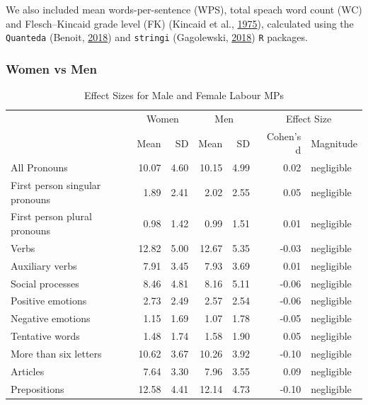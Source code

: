 \documentclass[]{article}
\theoremstyle{definition}
\theoremstyle{definition}
\theoremstyle{definition}
\theoremstyle{remark}
\begin{document}
We also included mean words-per-sentence (WPS), total speach word count
(WC) and Flesch--Kincaid grade level (FK) (Kincaid et al.,
\protect\hyperlink{ref-kincaid1975}{1975}), calculated using the
\texttt{Quanteda} (Benoit, \protect\hyperlink{ref-benoit2018}{2018}) and
\texttt{stringi} (Gagolewski,
\protect\hyperlink{ref-gagolewski2018}{2018}) \texttt{R} packages.

\hypertarget{women-vs-men}{%
\subsubsection{Women vs Men}\label{women-vs-men}}

\begin{table}[H]

\caption{\label{tab:gender-effect-sizes-table}Effect Sizes for Male and Female Labour MPs}
\centering
\begin{tabular}[t]{lrrrrrl}
\toprule
\multicolumn{1}{c}{ } & \multicolumn{2}{c}{Women} & \multicolumn{2}{c}{Men} & \multicolumn{2}{c}{Effect Size} \\
\cmidrule(l{2pt}r{2pt}){2-3} \cmidrule(l{2pt}r{2pt}){4-5} \cmidrule(l{2pt}r{2pt}){6-7}
 & Mean & SD & Mean & SD & Cohen's d & Magnitude\\
\midrule
All Pronouns & 10.07 & 4.60 & 10.15 & 4.99 & 0.02 & negligible\\
First person singular pronouns & 1.89 & 2.41 & 2.02 & 2.55 & 0.05 & negligible\\
First person plural pronouns & 0.98 & 1.42 & 0.99 & 1.51 & 0.01 & negligible\\
Verbs & 12.82 & 5.00 & 12.67 & 5.35 & -0.03 & negligible\\
Auxiliary verbs & 7.91 & 3.45 & 7.93 & 3.69 & 0.01 & negligible\\
\addlinespace
Social processes & 8.46 & 4.81 & 8.16 & 5.11 & -0.06 & negligible\\
Positive emotions & 2.73 & 2.49 & 2.57 & 2.54 & -0.06 & negligible\\
Negative emotions & 1.15 & 1.69 & 1.07 & 1.78 & -0.05 & negligible\\
Tentative words & 1.48 & 1.74 & 1.58 & 1.90 & 0.05 & negligible\\
More than six letters & 10.62 & 3.67 & 10.26 & 3.92 & -0.10 & negligible\\
\addlinespace
Articles & 7.64 & 3.30 & 7.96 & 3.55 & 0.09 & negligible\\
Prepositions & 12.58 & 4.41 & 12.14 & 4.73 & -0.10 & negligible\\

\end{tabular}
\end{table}
\end{document}
